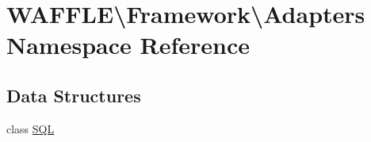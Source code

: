 \hypertarget{namespace_w_a_f_f_l_e_1_1_framework_1_1_adapters}{}\section{W\+A\+F\+F\+LE\textbackslash{}Framework\textbackslash{}Adapters Namespace Reference}
\label{namespace_w_a_f_f_l_e_1_1_framework_1_1_adapters}
\subsection*{Data Structures}
\begin{DoxyCompactItemize}
\item 
class \hyperlink{class_w_a_f_f_l_e_1_1_framework_1_1_adapters_1_1_s_q_l}{S\+QL}
\end{DoxyCompactItemize}
